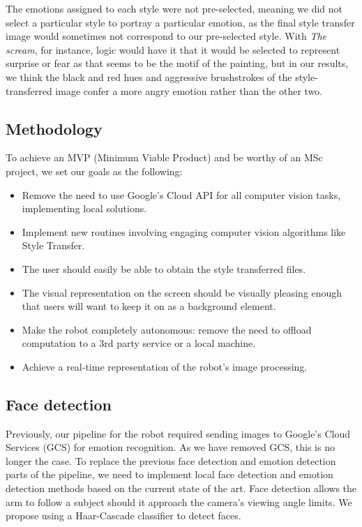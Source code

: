 The emotions assigned to each style were not pre-selected, meaning we did not select a particular style to portray a particular emotion, as the final style transfer image would sometimes not correspond to our pre-selected style. With \emph{The scream}, for instance, logic would have it that it would be selected to represent surprise or fear as that seems to be the motif of the painting, but in our results, we think the black and red hues and aggressive brushstrokes of the style-transferred image confer a more angry emotion rather than the other two.



\subsection{Methodology}
To achieve an MVP (Minimum Viable Product) and be worthy of an MSc project, we set our goals as the following:

\begin{itemize}
  \item Remove the need to use Google's Cloud API for all computer vision tasks, implementing local solutions.
  \item Implement new routines involving engaging computer vision algorithms like Style Transfer.
  \item The user should easily be able to obtain the style transferred files.
  \item The visual representation on the screen should be visually pleasing enough that users will want to keep it on as a background element.
  \item Make the robot completely autonomous: remove the need to offload computation to a 3rd party service or a local machine.
  \item Achieve a real-time representation of the robot's image processing.
\end{itemize}


\subsection{Face detection}

Previously, our pipeline for the robot required sending images to Google's Cloud Services (GCS) for emotion recognition. As we have removed GCS, this is no longer the case. To replace the previous face detection and emotion detection parts of the pipeline, we need to implement local face detection and emotion detection methods based on the current state of the art. Face detection allows the arm to follow a subject should it approach the camera's viewing angle limits. We propose using a Haar-Cascade classifier to detect faces. 

